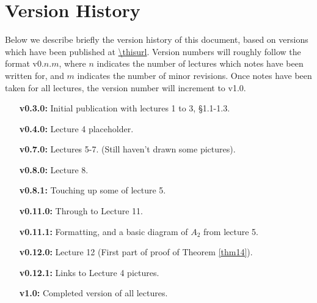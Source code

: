 \section{Version History}
Below we describe briefly the version history of this document, based on
versions which have been published at \url{\thisurl}. Version numbers will
roughly follow the format v0.$n$.$m$, where $n$ indicates the number of
lectures which notes have been written for, and $m$ indicates the number of
minor revisions. Once notes have been taken for all lectures, the version
number will increment to v1.0.

\begin{enumerate}
\item[\bf v0.3.0:] Initial publication with lectures 1 to 3, \S1.1-1.3.
\item[\bf v0.4.0:] Lecture 4 placeholder.
\item[\bf v0.7.0:] Lectures 5-7. (Still haven't drawn some pictures).
\item[\bf v0.8.0:] Lecture 8.
\item[\bf v0.8.1:] Touching up some of lecture 5.
\item[\bf v0.11.0:] Through to Lecture 11.
\item[\bf v0.11.1:] Formatting, and a basic diagram of $A_2$ from lecture 5.
\item[\bf v0.12.0:] Lecture 12 (First part of proof of Theorem \ref{thm14}).
\item[\bf v0.12.1:] Links to Lecture 4 pictures.
\item[\bf v1.0:] Completed version of all lectures.
\end{enumerate}
